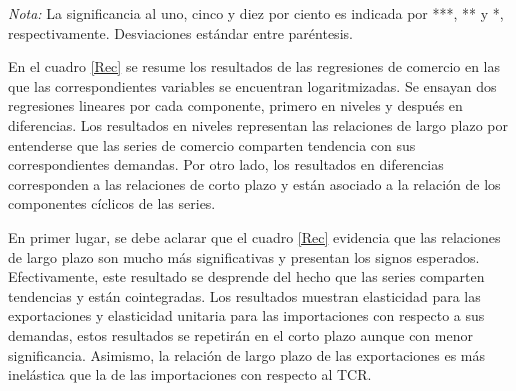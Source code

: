 \documentclass[12pt,letterpaper]{article}
\begin{document}
\begin{table}
\caption{Regresiones de Comercio}
\begin{center}
\end{center}
\begin{scriptsize}
\emph{Nota:} La significancia al uno, cinco y diez por ciento es indicada por ***, ** y *, respectivamente. Desviaciones estándar entre paréntesis.
\end{scriptsize}								
\label{Rec}	
\end{table}	

En el cuadro \ref{Rec} se resume los resultados de las regresiones de comercio en las que las correspondientes variables se encuentran logaritmizadas. Se ensayan dos regresiones lineares por cada componente, primero en niveles y después en diferencias. Los resultados en niveles representan las relaciones de largo plazo por entenderse que las series de comercio comparten tendencia con sus correspondientes demandas. Por otro lado, los resultados en diferencias corresponden a las relaciones de corto plazo y están asociado a la relación de los componentes cíclicos de las series.

En primer lugar, se debe aclarar que el cuadro \ref{Rec} evidencia que las relaciones de largo plazo son mucho más significativas y presentan los signos esperados. Efectivamente, este resultado se desprende del hecho que las series comparten tendencias y están cointegradas. Los resultados muestran elasticidad para las exportaciones y elasticidad unitaria para las importaciones con respecto a sus demandas, estos resultados se repetirán en el corto plazo aunque con menor significancia. Asimismo, la relación de largo plazo de las exportaciones es más inelástica que la de las importaciones con respecto al TCR.
\end{document}
